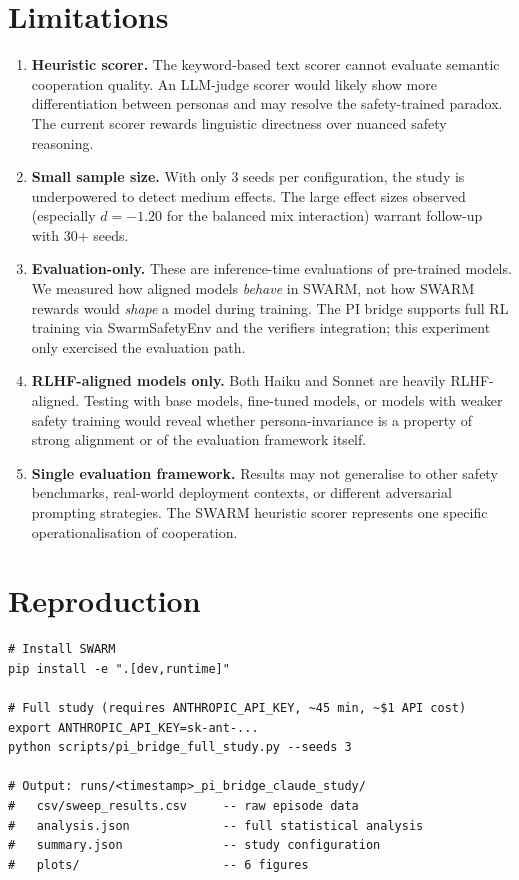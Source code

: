 \documentclass[11pt]{article}
\begin{document}
\section{Limitations}

\begin{enumerate}
  \item \textbf{Heuristic scorer.} The keyword-based text scorer cannot evaluate semantic cooperation quality. An LLM-judge scorer would likely show more differentiation between personas and may resolve the safety-trained paradox. The current scorer rewards linguistic directness over nuanced safety reasoning.

  \item \textbf{Small sample size.} With only 3 seeds per configuration, the study is underpowered to detect medium effects. The large effect sizes observed (especially $d = -1.20$ for the balanced mix interaction) warrant follow-up with 30+ seeds.

  \item \textbf{Evaluation-only.} These are inference-time evaluations of pre-trained models. We measured how aligned models \textit{behave} in SWARM, not how SWARM rewards would \textit{shape} a model during training. The PI bridge supports full RL training via SwarmSafetyEnv and the verifiers integration; this experiment only exercised the evaluation path.

  \item \textbf{RLHF-aligned models only.} Both Haiku and Sonnet are heavily RLHF-aligned. Testing with base models, fine-tuned models, or models with weaker safety training would reveal whether persona-invariance is a property of strong alignment or of the evaluation framework itself.

  \item \textbf{Single evaluation framework.} Results may not generalise to other safety benchmarks, real-world deployment contexts, or different adversarial prompting strategies. The SWARM heuristic scorer represents one specific operationalisation of cooperation.
\end{enumerate}

\section{Reproduction}

\begin{verbatim}
# Install SWARM
pip install -e ".[dev,runtime]"

# Full study (requires ANTHROPIC_API_KEY, ~45 min, ~$1 API cost)
export ANTHROPIC_API_KEY=sk-ant-...
python scripts/pi_bridge_full_study.py --seeds 3

# Output: runs/<timestamp>_pi_bridge_claude_study/
#   csv/sweep_results.csv     -- raw episode data
#   analysis.json             -- full statistical analysis
#   summary.json              -- study configuration
#   plots/                    -- 6 figures
\end{verbatim}
\end{document}
